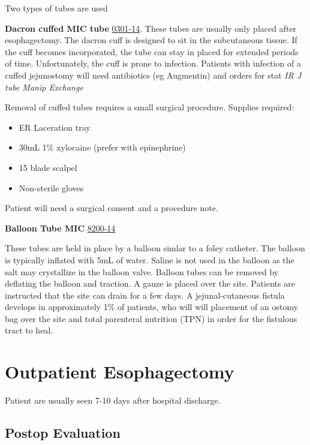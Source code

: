 \documentclass[
  letterpaper,
]{scrbook}
\providecommand{\tightlist}{%
  \setlength{\itemsep}{0pt}\setlength{\parskip}{0pt}}
\begin{document}
Two types of tubes are used

\textbf{Dacron cuffed MIC tube}
\href{https://avanos.com/product-catalog/product/mic-jejunostomy-tubes/0301-14__mic-jejunostomy-feeding-tube-14-fr/}{0301-14}.
These tubes are usually only placed after esophagectomy. The dacron cuff
is designed to sit in the subcutaneous tissue. If the cuff becomes
incorporated, the tube can stay in placed for extended periods of time.
Unfortunately, the cuff is prone to infection. Patients with infection
of a cuffed jejunostomy will need antibiotics (eg Augmentin) and orders
for stat \emph{IR J tube Manip Exchange}

Removal of cuffed tubes requires a small surgical procedure. Supplies
required:

\begin{itemize}
\tightlist
\item
  ER Laceration tray
\item
  30mL 1\% xylocaine (prefer with epinephrine)
\item
  15 blade scalpel
\item
  Non-sterile gloves
\end{itemize}

Patient will need a surgical consent and a procedure note.

\textbf{Balloon Tube MIC}
\href{https://avanos.com/product-catalog/product/mic-jejunal-j-feeding-tubes/8200-14__mic-jejunal-feeding-tube-with-enfit-connector-14-fr/}{8200-14}

These tubes are held in place by a balloon simlar to a foley catheter.
The balloon is typically inflated with 5mL of water. Saline is not used
in the balloon as the salt may crystallize in the balloon valve. Balloon
tubes can be removed by deflating the balloon and traction. A gauze is
placed over the site. Patients are instructed that the site can drain
for a few days. A jejunal-cutaneous fistula develops in approximately
1\% of patients, who will will placement of an ostomy bag over the site
and total parenteral nutrition (TPN) in order for the fistulous tract to
heal.

\chapter{Outpatient Esophagectomy}\label{outpt_mie}

Patient are usually seen 7-10 days after hospital discharge.

\section{Postop Evaluation}\label{postop-evaluation}
\end{document}
